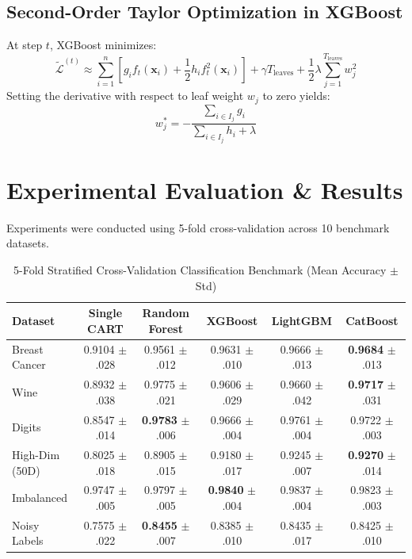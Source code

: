 \documentclass[10pt,journal,compsoc]{IEEEtran}
\begin{document}
\subsection{Second-Order Taylor Optimization in XGBoost}
At step $t$, XGBoost minimizes:
\begin{equation}
\tilde{\mathcal{L}}^{(t)} \approx \sum_{i=1}^n \left[ g_i f_t(\mathbf{x}_i) + \frac{1}{2} h_i f_t^2(\mathbf{x}_i) \right] + \gamma T_{\text{leaves}} + \frac{1}{2} \lambda \sum_{j=1}^{T_{\text{leaves}}} w_j^2
\end{equation}
Setting the derivative with respect to leaf weight $w_j$ to zero yields:
\begin{equation}
w_j^* = -\frac{\sum_{i \in I_j} g_i}{\sum_{i \in I_j} h_i + \lambda}
\end{equation}

\section{Experimental Evaluation \& Results}
Experiments were conducted using 5-fold cross-validation across 10 benchmark datasets.

\begin{table}[t]
\centering
\caption{5-Fold Stratified Cross-Validation Classification Benchmark (Mean Accuracy $\pm$ Std)}
\label{tab:classification}
\begin{tabular}{lccccc}
\toprule
Dataset & Single CART & Random Forest & XGBoost & LightGBM & CatBoost \\
\midrule
Breast Cancer & 0.9104 $\pm$ .028 & 0.9561 $\pm$ .012 & 0.9631 $\pm$ .010 & 0.9666 $\pm$ .013 & \textbf{0.9684} $\pm$ .013 \\
Wine & 0.8932 $\pm$ .038 & 0.9775 $\pm$ .021 & 0.9606 $\pm$ .029 & 0.9660 $\pm$ .042 & \textbf{0.9717} $\pm$ .031 \\
Digits & 0.8547 $\pm$ .014 & \textbf{0.9783} $\pm$ .006 & 0.9666 $\pm$ .004 & 0.9761 $\pm$ .004 & 0.9722 $\pm$ .003 \\
High-Dim (50D) & 0.8025 $\pm$ .018 & 0.8905 $\pm$ .015 & 0.9180 $\pm$ .017 & 0.9245 $\pm$ .007 & \textbf{0.9270} $\pm$ .014 \\
Imbalanced & 0.9747 $\pm$ .005 & 0.9797 $\pm$ .005 & \textbf{0.9840} $\pm$ .004 & 0.9837 $\pm$ .004 & 0.9823 $\pm$ .003 \\
Noisy Labels & 0.7575 $\pm$ .022 & \textbf{0.8455} $\pm$ .007 & 0.8385 $\pm$ .010 & 0.8435 $\pm$ .017 & 0.8425 $\pm$ .010 \\
\bottomrule
\end{tabular}
\end{table}
\end{document}
